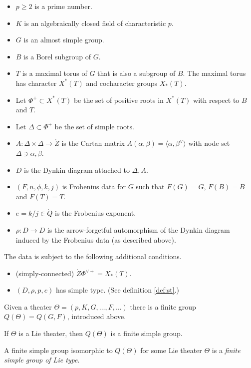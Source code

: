 \begin{itemize}
\item $p\ge 2$ is a prime number.
\item $K$ is an algebraically closed field of characteristic $p$.
\item $G$ is an almost simple group.
\item $B$ is a Borel subgroup of $G$.
\item $T$ is a maximal torus of $G$ that is also a subgroup of $B$.
  The maximal torus has character $X^*(T)$ and cocharacter groups $X_*(T)$.
\item Let $\Phi^+\subset X^*(T)$ be the set of positive roots in $X^*(T)$
  with respect to $B$ and $T$.
\item Let $\Delta\subset \Phi^+$ be the set of simple roots.
\item $A:\Delta\times\Delta\to\ring{Z}$ is the Cartan matrix
  $A(\alpha,\beta)=\langle \alpha,\beta^\vee\rangle$ with node set $\Delta\ni\alpha,\beta$.
\item $D$ is the Dynkin diagram attached to $\Delta,A$.
\item $(F,n,\phi,k,j)$ is Frobenius data for $G$ such that $F(G)=G$,
  $F(B)=B$ and $F(T)=T$.
\item $e = k/j\in \ring{Q}$ is the Frobenius exponent.
\item $\rho:D\to D$ is the arrow-forgetful automorphism of the Dynkin diagram induced
  by the Frobenius data (as described above).
\end{itemize}

The data is subject to the following additional conditions.

\begin{itemize}
\item (simply-connected)  $\ring{Z}\Phi^{\vee+} = X_*(T)$.
\item $(D,\rho,p,e)$ has simple type. (See definition \ref{def:st}.)
\end{itemize}

Given a theater $\Theta =(p,K,G,\ldots,F,\ldots)$ there is a finite
group $Q(\Theta) = Q(G,F)$, introduced above.

\begin{theorem}  If $\Theta$ is a Lie theater, then $Q(\Theta)$
  is a finite simple group.
\end{theorem}


\begin{definition}\label{def:fsg-Lie}
  A finite simple group isomorphic to $Q(\Theta)$ for some
  Lie theater $\Theta$ is a {\it finite simple group of Lie type}.
\end{definition}


